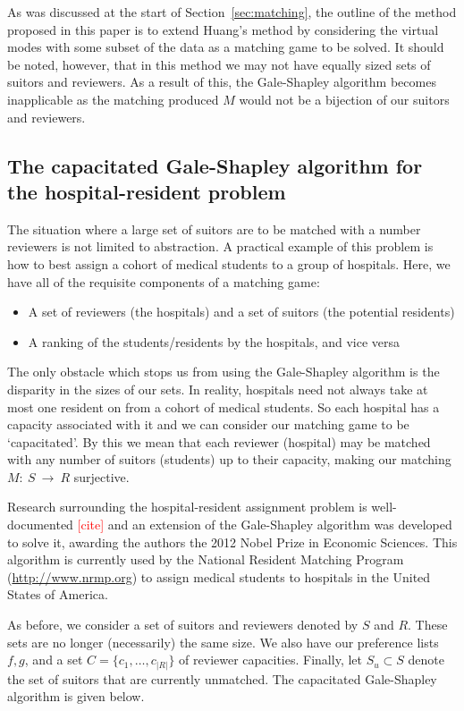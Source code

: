 As was discussed at the start of Section~\ref{sec:matching}, the outline of
the method proposed in this paper is to extend Huang's method by considering the
virtual modes with some subset of the data as a matching game to be solved. It
should be noted, however, that in this method we may not have equally sized 
sets of suitors and reviewers. As a result of this, the Gale-Shapley algorithm 
becomes inapplicable as the matching produced \(M\) would not be a bijection of 
our suitors and reviewers.

\subsection{The capacitated Gale-Shapley algorithm for the hospital-resident 
	problem}\label{subsec:capacitated_galeshapley}

The situation where a large set of suitors are to be matched with a number
reviewers is not limited to abstraction. A practical example of this problem is
how to best assign a cohort of medical students to a group of hospitals. Here, 
we have all of the requisite components of a matching game:

\begin{itemize}
	\item A set of reviewers (the hospitals) and a set of suitors (the potential
        residents) 
	\item A ranking of the students/residents by the hospitals, and vice versa
\end{itemize}

The only obstacle which stops us from using the Gale-Shapley algorithm is the 
disparity in the sizes of our sets. In reality, hospitals need not always take 
at most one resident on from a cohort of medical students. So each hospital has
a capacity associated with it and we can consider our matching game to be
`capacitated'. By this we mean that each reviewer (hospital) may be matched with
any number of suitors (students) up to their capacity, making our matching
\(M:~S~\to~R\) surjective.

Research surrounding the hospital-resident assignment problem is well-documented 
\textcolor{red}{[cite]} and an extension of the Gale-Shapley algorithm was
developed to solve it, awarding the authors the 2012 Nobel Prize in Economic
Sciences. This algorithm is currently used by the National Resident Matching
Program (\url{http://www.nrmp.org}) to assign medical students to hospitals in
the United States of America.

As before, we consider a set of suitors and reviewers denoted by \(S\) and 
\(R\). These sets are no longer (necessarily) the same size. We also have our 
preference lists \(f, g\), and a set \(C = \{c_1, \ldots, c_{|R|}\}\) of 
reviewer capacities. Finally, let \(S_u \subset S\) denote the set of suitors 
that are currently unmatched. The capacitated Gale-Shapley algorithm is given 
below.

\begin{singlespace}
    
\end{singlespace}
